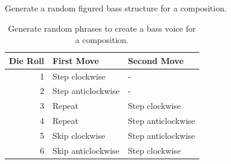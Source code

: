 \documentclass{scrartcl}
\numberwithin{example}{section}
\begin{document}
\begin{table}[p]
\caption{Generate a random figured bass structure for a composition.}
\centering
\begin{subtable}[t]{0.9\textwidth}
\centering
\caption{Generate random phrases to create a bass voice for a composition.\newline }
\begin{tabular}{@{}r l l@{}}
\toprule
Die Roll & First Move & Second Move \\
\midrule
1 & Step clockwise & - \\
2 & Step anticlockwise & - \\
3 & Repeat & Step clockwise \\
4 & Repeat & Step anticlockwise \\
5 & Skip clockwise & Step anticlockwise \\
6 & Skip anticlockwise & Step clockwise \\
\bottomrule
\end{tabular}
\end{subtable}

\bigskip\bigskip


\end{table}
\end{document}
